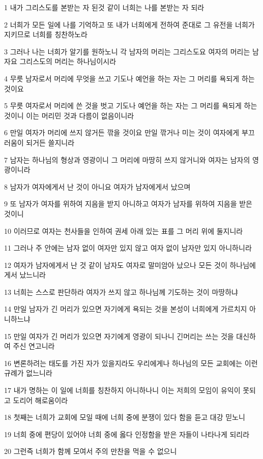 \par 1 내가 그리스도를 본받는 자 된것 같이 너희는 나를 본받는 자 되라
\par 2 너희가 모든 일에 나를 기억하고 또 내가 너희에게 전하여 준대로 그 유전을 너희가 지키므로 너희를 칭찬하노라
\par 3 그러나 나는 너희가 알기를 원하노니 각 남자의 머리는 그리스도요 여자의 머리는 남자요 그리스도의 머리는 하나님이시라
\par 4 무릇 남자로서 머리에 무엇을 쓰고 기도나 예언을 하는 자는 그 머리를 욕되게 하는 것이요
\par 5 무릇 여자로서 머리에 쓴 것을 벗고 기도나 예언을 하는 자는 그 머리를 욕되게 하는 것이니 이는 머리민 것과 다름이 없음이니라
\par 6 만일 여자가 머리에 쓰지 않거든 깎을 것이요 만일 깎거나 미는 것이 여자에게 부끄러움이 되거든 쓸지니라
\par 7 남자는 하나님의 형상과 영광이니 그 머리에 마땅히 쓰지 않거니와 여자는 남자의 영광이니라
\par 8 남자가 여자에게서 난 것이 아니요 여자가 남자에게서 났으며
\par 9 또 남자가 여자를 위하여 지음을 받지 아니하고 여자가 남자를 위하여 지음을 받은 것이니
\par 10 이러므로 여자는 천사들을 인하여 권세 아래 있는 표를 그 머리 위에 둘지니라
\par 11 그러나 주 안에는 남자 없이 여자만 있지 않고 여자 없이 남자만 있지 아니하니라
\par 12 여자가 남자에게서 난 것 같이 남자도 여자로 말미암아 났으나 모든 것이 하나님에게서 났느니라
\par 13 너희는 스스로 판단하라 여자가 쓰지 않고 하나님께 기도하는 것이 마땅하냐
\par 14 만일 남자가 긴 머리가 있으면 자기에게 욕되는 것을 본성이 너희에게 가르치지 아니하느냐
\par 15 만일 여자가 긴 머리가 있으면 자기에게 영광이 되나니 긴머리는 쓰는 것을 대신하여 주신 연고니라
\par 16 변론하려는 태도를 가진 자가 있을지라도 우리에게나 하나님의 모든 교회에는 이런 규례가 없느니라
\par 17 내가 명하는 이 일에 너희를 칭찬하지 아니하나니 이는 저희의 모임이 유익이 못되고 도리어 해로움이라
\par 18 첫째는 너희가 교회에 모일 때에 너희 중에 분쟁이 있다 함을 듣고 대강 믿노니
\par 19 너희 중에 편당이 있어야 너희 중에 옳다 인정함을 받은 자들이 나타나게 되리라
\par 20 그런즉 너희가 함께 모여서 주의 만찬을 먹을 수 없으니
